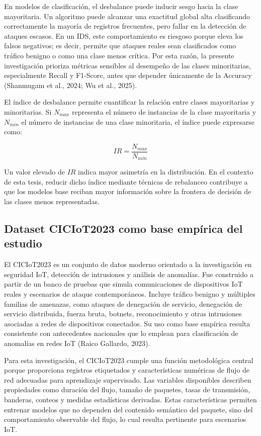 \documentclass[12pt,a4paper]{article}
\begin{document}
En modelos de clasificación, el desbalance puede inducir sesgo hacia la clase mayoritaria. Un algoritmo puede alcanzar una exactitud global alta clasificando correctamente la mayoría de registros frecuentes, pero fallar en la detección de ataques escasos. En un IDS, este comportamiento es riesgoso porque eleva los falsos negativos; es decir, permite que ataques reales sean clasificados como tráfico benigno o como una clase menos crítica. Por esta razón, la presente investigación prioriza métricas sensibles al desempeño de las clases minoritarias, especialmente Recall y F1-Score, antes que depender únicamente de la Accuracy (Shanmugam et al., 2024; Wu et al., 2025).

El índice de desbalance permite cuantificar la relación entre clases mayoritarias y minoritarias. Si $N_{max}$ representa el número de instancias de la clase mayoritaria y $N_{min}$ el número de instancias de una clase minoritaria, el índice puede expresarse como:

\[
IR = \frac{N_{max}}{N_{min}}
\]

Un valor elevado de $IR$ indica mayor asimetría en la distribución. En el contexto de esta tesis, reducir dicho índice mediante técnicas de rebalanceo contribuye a que los modelos base reciban mayor información sobre la frontera de decisión de las clases menos representadas.

\subsection{Dataset CICIoT2023 como base empírica del estudio}

El CICIoT2023 es un conjunto de datos moderno orientado a la investigación en seguridad IoT, detección de intrusiones y análisis de anomalías. Fue construido a partir de un banco de pruebas que simula comunicaciones de dispositivos IoT reales y escenarios de ataque contemporáneos. Incluye tráfico benigno y múltiples familias de amenazas, como ataques de denegación de servicio, denegación de servicio distribuida, fuerza bruta, botnets, reconocimiento y otras intrusiones asociadas a redes de dispositivos conectados. Su uso como base empírica resulta consistente con antecedentes nacionales que lo emplean para clasificación de anomalías en redes IoT (Raico Gallardo, 2023).

Para esta investigación, el CICIoT2023 cumple una función metodológica central porque proporciona registros etiquetados y características numéricas de flujo de red adecuadas para aprendizaje supervisado. Las variables disponibles describen propiedades como duración del flujo, tamaño de paquetes, tasas de transmisión, banderas, conteos y medidas estadísticas derivadas. Estas características permiten entrenar modelos que no dependen del contenido semántico del paquete, sino del comportamiento observable del flujo, lo cual resulta pertinente para escenarios IoT.
\end{document}
